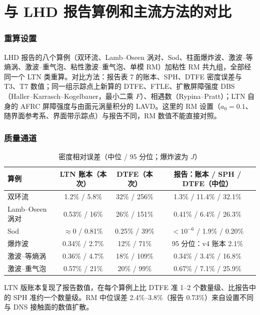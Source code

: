 \documentclass[11pt,a4paper]{article}
\begin{document}
\part{与 LHD 报告算例和主流方法的对比}\label{sec:lhd}
\section{重算设置}
LHD 报告的八个算例（双环流、Lamb–Oseen 涡对、Sod、柱面爆炸波、激波–等熵涡、激波–重气泡、粘性激波–重气泡、单模 RM）加粘性 RM 共九组，全部经同一个 LTN 类重算。对比方法：报告表 7 的账本、SPH、DTFE 密度误差与 T3、T7 数值；同一组示踪点上新算的 DTFE、FTLE、扩散屏障强度 DBS（Haller–Karrasch–Kogelbauer，最小二乘 $F$）、相遇数（Rypina–Pratt）；LTN 自身的 AFRC 屏障强度与由面元涡量积分的 LAVD。这里的 RM 设置（$a_0=0.1$、随界面参考系、界面带示踪点）与报告不同，RM 数值不能直接对照。

\section{质量通道}
\begin{table}[h]\centering\small\caption{密度相对误差（中位 / 95 分位；爆炸波为 $J$）}
\begin{tabular}{lccc}\toprule
算例 & LTN 账本（本次） & DTFE（本次） & 报告：账本 / SPH / DTFE（中位）\\\midrule
双环流 & 1.2\% / 5.8\% & 32\% / 256\% & 1.3\% / 11.4\% / 32.1\%\\
Lamb–Oseen 涡对 & 0.53\% / 16\% & 26\% / 151\% & 0.41\% / 6.4\% / 26.3\%\\
Sod & $\approx0$ / 0.81\% & 0.25\% / 39\% & $<10^{-6}$ / 1.9\% / 0.20\%\\
爆炸波 & 0.34\% / 2.7\% & 12\% / 71\% & 95 分位：v4 账本 2.1\%\\
激波–等熵涡 & 0.36\% / 4.7\% & 18\% / 109\% & 0.34\% / 3.4\% / 16.8\%\\
激波–重气泡 & 0.57\% / 21\% & 20\% / 99\% & 0.67\% / 7.1\% / 25.9\%\\\bottomrule
\end{tabular}\end{table}
LTN 版账本复现了报告数值，在每个算例上比 DTFE 准 1–2 个数量级、比报告中的 SPH 准约一个数量级。RM 中位误差 2.4\%–3.8\%（报告 0.73\%）来自设置不同与 DNS 接触面的数值扩散。
\end{document}
